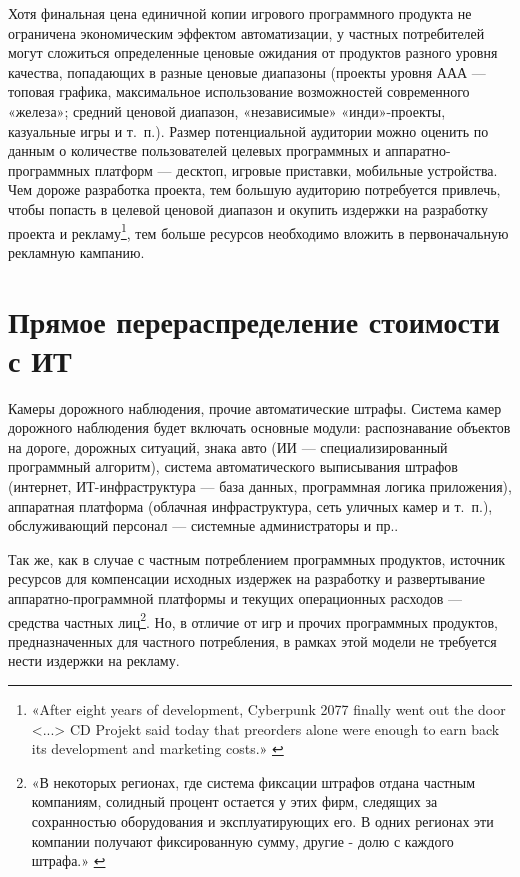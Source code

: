 \documentclass{article}
\begin{document}
Хотя финальная цена единичной копии игрового программного продукта не ограничена экономическим эффектом автоматизации, у частных потребителей могут сложиться определенные ценовые ожидания от продуктов разного уровня качества, попадающих в разные ценовые диапазоны (проекты уровня ААА — топовая графика, максимальное использование возможностей современного «железа»; средний ценовой диапазон, «независимые» «инди»-проекты, казуальные игры и т.~п.). Размер потенциальной аудитории можно оценить по данным о количестве пользователей целевых программных и аппаратно-программных платформ — десктоп, игровые приставки, мобильные устройства. Чем дороже разработка проекта, тем большую аудиторию потребуется привлечь, чтобы попасть в целевой ценовой диапазон и окупить издержки на разработку проекта и рекламу\footnote{«After eight years of development, Cyberpunk 2077 finally went out the door <...> CD Projekt said today that preorders alone were enough to earn back its development and marketing costs.» \cite{cyberpunkProfit}}, тем больше ресурсов необходимо вложить в первоначальную рекламную кампанию.

\section*{Прямое перераспределение стоимости с ИТ}

Камеры дорожного наблюдения, прочие автоматические штрафы. Система камер дорожного наблюдения будет включать основные модули: распознавание объектов на дороге, дорожных ситуаций, знака авто (ИИ — специализированный программный алгоритм), система автоматического выписывания штрафов (интернет, ИТ-инфраструктура — база данных, программная логика приложения), аппаратная платформа (облачная инфраструктура, сеть уличных камер и т.~п.), обслуживающий персонал — системные администраторы и пр..

Так же, как в случае с частным потреблением программных продуктов, источник ресурсов для компенсации исходных издержек на разработку и развертывание аппаратно-программной платформы и текущих операционных расходов — средства частных лиц\footnote{«В некоторых регионах, где система фиксации штрафов отдана частным компаниям, солидный процент остается у этих фирм, следящих за сохранностью оборудования и эксплуатирующих его. В одних регионах эти компании получают фиксированную сумму, другие - долю с каждого штрафа.» \cite{autoFineRF}}. Но, в отличие от игр и прочих программных продуктов, предназначенных для частного потребления, в рамках этой модели не требуется нести издержки на рекламу.
\end{document}
